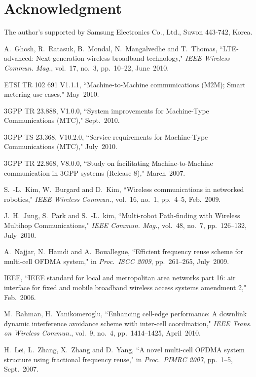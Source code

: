 \documentclass[conference]{IEEEtran}
\begin{document}
\section*{Acknowledgment}
The author's supported by Samsung Electronics Co., Ltd., Suwon 443-742, Korea.


\begin{thebibliography}{1}


A.~Ghosh, R.~Ratasuk, B.~Mondal, N.~Mangalvedhe and T.~Thomas, ``LTE-advanced: Next-generation wireless broadband technology," \emph{IEEE Wireless Commun. Mag.}, vol.~17, no.~3, pp.~10--22, June~2010.

ETSI TR 102 691 V1.1.1, ``Machine-to-Machine communications (M2M); Smart metering use cases," May~2010.

3GPP TR 23.888, V1.0.0, ``System improvements for Machine-Type Communications (MTC)," Sept.~2010.

3GPP TS 23.368, V10.2.0, ``Service requirements for Machine-Type Communications (MTC)," July~2010.

3GPP TR 22.868, V8.0.0, ``Study on facilitating Machine-to-Machine communication in 3GPP systems (Release 8)," March~2007.

S.~-L.~Kim, W.~Burgard and D.~Kim, ``Wireless communications in networked robotics," \emph{IEEE Wireless Commun.},
vol.~16, no.~1, pp.~4--5, Feb.~2009.

J.~H.~Jung, S.~Park and S.~-L.~kim, ``Multi-robot Path-finding with Wireless Multihop Communications," \emph{IEEE Commun. Mag.}, vol.~48, no.~7, pp.~126--132, July~2010.

A.~Najjar, N.~Hamdi and A.~Bouallegue, ``Efficient frequency reuse scheme for multi-cell OFDMA system,"
in \emph{Proc.~ISCC 2009}, pp.~261--265, July~2009.

IEEE, ``IEEE standard for local and metropolitan area networks part 16: air interface for fixed and mobile broadband wireless access systems amendment 2," Feb.~2006.

M.~Rahman, H.~Yanikomeroglu, ``Enhancing cell-edge performance: A downlink dynamic interference avoidance scheme with inter-cell coordination," \emph{IEEE Trans. on Wireless Commun.}, vol.~9, no.~4, pp.~1414--1425, April~2010.

H.~Lei, L.~Zhang, X.~Zhang and D.~Yang, ``A novel multi-cell OFDMA system structure using fractional frequency reuse," in \emph{Proc.~PIMRC 2007}, pp.~1--5, Sept.~2007.


\end{thebibliography}
\end{document}
